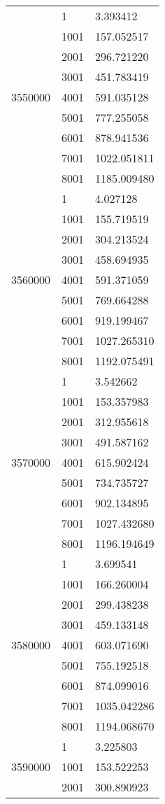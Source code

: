 \begin{table}[htb!]
\begin{tabular}{lll}
\multirow[c]{9}{*}{3550000} & 1 & 3.393412 \\
 & 1001 & 157.052517 \\
 & 2001 & 296.721220 \\
 & 3001 & 451.783419 \\
 & 4001 & 591.035128 \\
 & 5001 & 777.255058 \\
 & 6001 & 878.941536 \\
 & 7001 & 1022.051811 \\
 & 8001 & 1185.009480 \\
\multirow[c]{9}{*}{3560000} & 1 & 4.027128 \\
 & 1001 & 155.719519 \\
 & 2001 & 304.213524 \\
 & 3001 & 458.694935 \\
 & 4001 & 591.371059 \\
 & 5001 & 769.664288 \\
 & 6001 & 919.199467 \\
 & 7001 & 1027.265310 \\
 & 8001 & 1192.075491 \\
\multirow[c]{9}{*}{3570000} & 1 & 3.542662 \\
 & 1001 & 153.357983 \\
 & 2001 & 312.955618 \\
 & 3001 & 491.587162 \\
 & 4001 & 615.902424 \\
 & 5001 & 734.735727 \\
 & 6001 & 902.134895 \\
 & 7001 & 1027.432680 \\
 & 8001 & 1196.194649 \\
\multirow[c]{9}{*}{3580000} & 1 & 3.699541 \\
 & 1001 & 166.260004 \\
 & 2001 & 299.438238 \\
 & 3001 & 459.133148 \\
 & 4001 & 603.071690 \\
 & 5001 & 755.192518 \\
 & 6001 & 874.099016 \\
 & 7001 & 1035.042286 \\
 & 8001 & 1194.068670 \\
\multirow[c]{9}{*}{3590000} & 1 & 3.225803 \\
 & 1001 & 153.522253 \\
 & 2001 & 300.890923 \\

\end{tabular}
\end{table}
